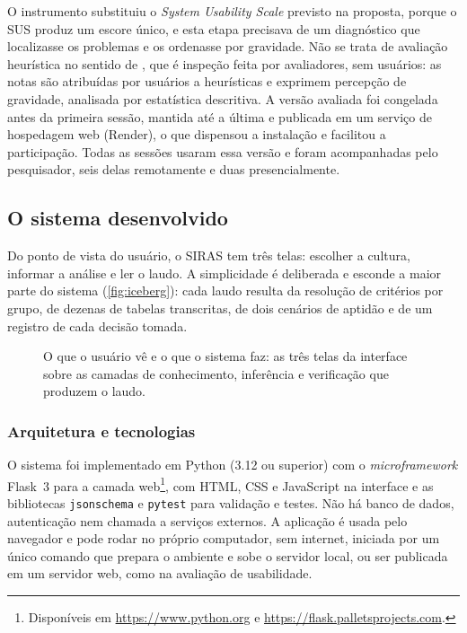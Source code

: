 O instrumento substituiu o \textit{System Usability Scale} \citep{Brooke1996} previsto na proposta,
porque o SUS produz um escore único, e esta etapa precisava de um diagnóstico que localizasse os
problemas e os ordenasse por gravidade. Não se trata de avaliação heurística no sentido de
\cite{NielsenMolich1990}, que é inspeção feita por avaliadores, sem usuários: as notas são atribuídas
por usuários a heurísticas e exprimem percepção de gravidade, analisada por estatística
descritiva. A versão avaliada foi congelada antes da primeira sessão, mantida até a última e
publicada em um serviço de hospedagem web (Render), o que dispensou a instalação e facilitou a
participação. Todas as sessões usaram essa versão e foram acompanhadas pelo pesquisador, seis
delas remotamente e duas presencialmente.

\subsection{O sistema desenvolvido}\label{sec:siras}

Do ponto de vista do usuário, o SIRAS tem três telas: escolher a cultura, informar a análise e
ler o laudo. A simplicidade é deliberada e esconde a maior parte do sistema
(\autoref{fig:iceberg}): cada laudo resulta da resolução de critérios por grupo, de dezenas de
tabelas transcritas, de dois cenários de aptidão e de um registro de cada decisão tomada.

\begin{figure}[!tbp]
\centering
{}
\caption{O que o usuário vê e o que o sistema faz: as três telas da interface sobre as camadas
de conhecimento, inferência e verificação que produzem o laudo.}
\label{fig:iceberg}
\end{figure}

\subsubsection{Arquitetura e tecnologias}

O sistema foi implementado em Python (3.12 ou superior) com o \textit{microframework} Flask~3 para a camada
web\footnote{Disponíveis em \url{https://www.python.org} e
\url{https://flask.palletsprojects.com}.}, com HTML, CSS e JavaScript na interface e as
bibliotecas \texttt{jsonschema} e \texttt{pytest} para validação e testes. Não há banco de dados,
autenticação nem chamada a serviços externos. A aplicação é usada pelo navegador e pode rodar no
próprio computador, sem internet, iniciada por um único comando que prepara o ambiente e sobe o
servidor local, ou ser publicada em um servidor web, como na avaliação de usabilidade.

